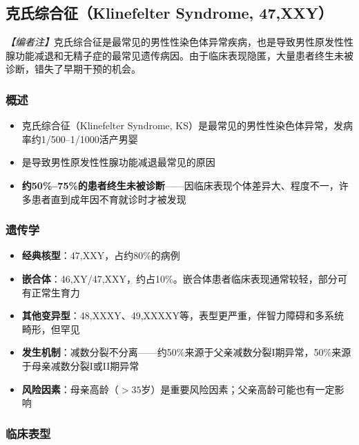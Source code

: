 \begin{enumerate}
\subsection{克氏综合征（Klinefelter Syndrome, 47,XXY）}

\noindent\textit{【编者注】}克氏综合征是最常见的男性性染色体异常疾病，也是导致男性原发性性腺功能减退和无精子症的最常见遗传病因。由于临床表现隐匿，大量患者终生未被诊断，错失了早期干预的机会。

\subsubsection{概述}

\begin{itemize}[leftmargin=2cm]
	\item 克氏综合征（Klinefelter Syndrome, KS）是最常见的男性性染色体异常，发病率约1/500--1/1000活产男婴
	\item 是导致男性原发性性腺功能减退最常见的原因
	\item \textbf{约50\%--75\%的患者终生未被诊断}——因临床表现个体差异大、程度不一，许多患者直到成年因不育就诊时才被发现
\end{itemize}

\subsubsection{遗传学}

\begin{itemize}[leftmargin=2cm]
	\item \textbf{经典核型}：47,XXY，占约80\%的病例
	\item \textbf{嵌合体}：46,XY/47,XXY，约占10\%。嵌合体患者临床表现通常较轻，部分可有正常生育力
	\item \textbf{其他变异型}：48,XXXY、49,XXXXY等，表型更严重，伴智力障碍和多系统畸形，但罕见
	\item \textbf{发生机制}：减数分裂不分离——约50\%来源于父亲减数分裂I期异常，50\%来源于母亲减数分裂I或II期异常
	\item \textbf{风险因素}：母亲高龄（$>35$岁）是重要风险因素；父亲高龄可能也有一定影响
\end{itemize}

\subsubsection{临床表型}


\end{enumerate}
